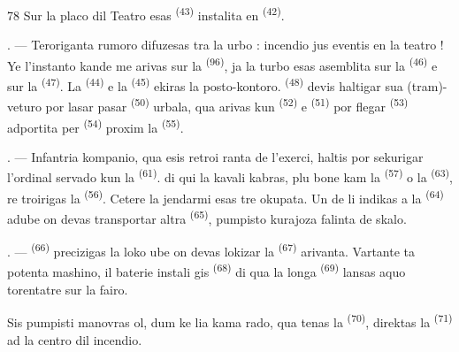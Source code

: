 \begin{VUpage}[80]{78}
\VUblancAlinea
Sur la placo dil Teatro esas  \textsuperscript{(43)}\nl
instalita en  \textsuperscript{(42)}.

\VUsaut{5.0mm}
\VUsaut{3.0mm}

\VUsaut{3.4mm}

. --- Teroriganta rumoro difuzesas tra la\nl
urbo : incendio jus eventis en la teatro ! Ye\nl
l'instanto kande me arivas sur la  \textsuperscript{(96)}, ja\nl
la turbo esas asemblita sur la  \textsuperscript{(46)} e\nl
sur la  \textsuperscript{(47)}. La  \textsuperscript{(44)} e la \cc
{} \textsuperscript{(45)} ekiras la posto-kontoro.  \textsuperscript{(48)}\nl
devis haltigar sua (tram)-veturo por lasar pasar\nl
{} \textsuperscript{(50)} urbala, qua arivas kun\nl
{} \textsuperscript{(52)} e  \textsuperscript{(51)} por flegar \cc
{} \textsuperscript{(53)} adportita per  \textsuperscript{(54)} proxim la \cc
{} \textsuperscript{(55)}.

. --- Infantria kompanio, qua esis retroi\cc
ranta de l'exerci, haltis por sekurigar l'ordinal\nl
servado kun la  \textsuperscript{(61)}.\nl
{} di qui la kavali kabras, plu\nl
bone kam la  \textsuperscript{(57)} o la  \textsuperscript{(63)}, re\cc
troirigas la  \textsuperscript{(56)}. Cetere la jendarmi esas\nl
tre okupata. Un de li indikas a la  \textsuperscript{(64)}\nl
adube on devas transportar altra  \textsuperscript{(65)},\nl
pumpisto kurajoza falinta de skalo.

. ---  \textsuperscript{(66)} precizigas la loko ube on\nl
devas lokizar la  \textsuperscript{(67)} arivanta.\nl
Vartante ta potenta mashino, il baterie instali\cc
gis  \textsuperscript{(68)} di qua la longa  \textsuperscript{(69)}\nl
lansas aquo torentatre sur la fairo.

\VUblancAlinea
Sis pumpisti manovras ol, dum ke lia kama\cc
rado, qua tenas la  \textsuperscript{(70)}, direktas la \cc
{} \textsuperscript{(71)} ad la centro dil incendio.
\end{VUpage}

